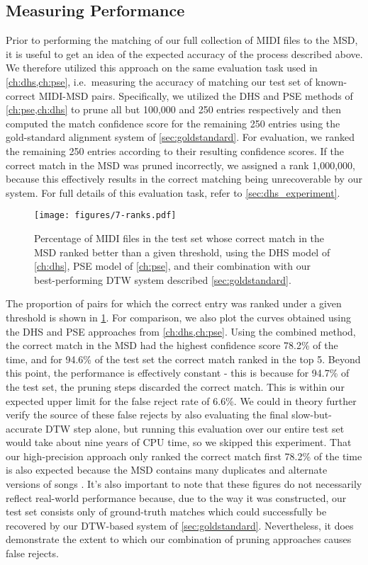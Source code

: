 \subsection{Measuring Performance}

Prior to performing the matching of our full collection of MIDI files to the MSD, it is useful to get an idea of the expected accuracy of the process described above.
We therefore utilized this approach on the same evaluation task used in \cref{ch:dhs,ch:pse}, i.e.\ measuring the accuracy of matching our test set of known-correct MIDI-MSD pairs.
Specifically, we utilized the DHS and PSE methods of \cref{ch:pse,ch:dhs} to prune all but 100,000 and 250 entries respectively and then computed the match confidence score for the remaining 250 entries using the gold-standard alignment system of \cref{sec:goldstandard}.
For evaluation, we ranked the remaining 250 entries according to their resulting confidence scores.
If the correct match in the MSD was pruned incorrectly, we assigned a rank 1,000,000, because this effectively results in the correct matching being unrecoverable by our system.
For full details of this evaluation task, refer to \cref{sec:dhs_experiment}.

\begin{figure}
  \texttt{[image: figures/7-ranks.pdf]}
  \caption[Percentage of the test set below a given rank]{Percentage of MIDI files in the test set whose correct match in the MSD ranked better than a given threshold, using the DHS model of \cref{ch:dhs}, PSE model of \cref{ch:pse}, and their combination with our best-performing DTW system described \cref{sec:goldstandard}.}
  \label{fig:combined_ranks}
\end{figure}

The proportion of pairs for which the correct entry was ranked under a given threshold is shown in \cref{fig:combined_ranks}.
For comparison, we also plot the curves obtained using the DHS and PSE approaches from \cref{ch:dhs,ch:pse}.
Using the combined method, the correct match in the MSD had the highest confidence score 78.2\% of the time, and for 94.6\% of the test set the correct match ranked in the top 5.
Beyond this point, the performance is effectively constant - this is because for 94.7\% of the test set, the pruning steps discarded the correct match.
This is within our expected upper limit for the false reject rate of 6.6\%.
We could in theory further verify the source of these false rejects by also evaluating the final slow-but-accurate DTW step alone, but running this evaluation over our entire test set would take about nine years of CPU time, so we skipped this experiment.
That our high-precision approach only ranked the correct match first 78.2\% of the time is also expected because the MSD contains many duplicates and alternate versions of songs \cite{bertin2012large}.
It's also important to note that these figures do not necessarily reflect real-world performance because, due to the way it was constructed, our test set consists only of ground-truth matches which could successfully be recovered by our DTW-based system of \cref{sec:goldstandard}.
Nevertheless, it does demonstrate the extent to which our combination of pruning approaches causes false rejects.

